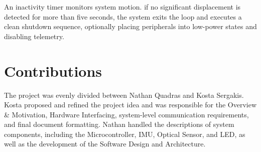 \documentclass[12pt]{article}
\begin{document}
                An inactivity timer monitors system motion. if no significant displacement is detected for more than five seconds, the system exits the loop and executes a 
                clean shutdown sequence, optionally placing peripherals into low-power states and disabling telemetry.
    
    \section{Contributions}

        The project was evenly divided between Nathan Quadras and Kosta Sergakis. Kosta proposed and refined the project idea and was responsible for the Overview \& Motivation, 
        Hardware Interfacing, system-level communication requirements, and final document formatting. Nathan handled the descriptions of system components, including the 
        Microcontroller, IMU, Optical Sensor, and LED, as well as the development of the Software Design and Architecture.
    

    \newpage
    \printbibliography[title=Works Cited]

\end{document}
